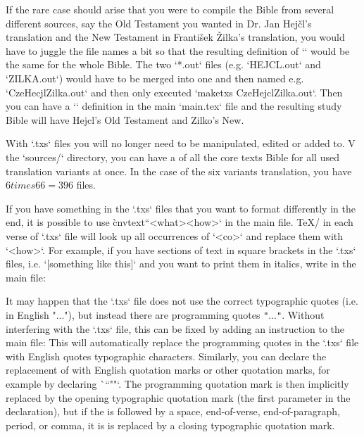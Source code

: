 If the rare case should arise that you were to compile the Bible from several different sources, say the Old Testament you wanted in Dr. Jan Hejčl's translation and the New Testament in František Žilka's translation, you would have to juggle the file names a bit so that the resulting definition of `\tmark` would be the same for the whole Bible. The two `*.out` files (e.g. `HEJCL.out` and `ZILKA.out`) would have to be merged into one and then named e.g. `CzeHecjlZilka.out` and then only executed 
`maketxs CzeHejclZilka.out`.  Then you can have a `\def\tmark{HejclZilka}` definition in the main `main.tex` file and 
the resulting study Bible will have Hejcl's Old Testament and Zilko's New.








With `.txs` files you will no longer
need to be manipulated, edited or added to. V
the `sources/` directory, you can have a  of all the core texts
Bible for all used translation variants at once. In the case of the six variants
translation, you have $6 times 66=396$ files.

If you have something in the `.txs` files that you want to format differently in the end, it is possible to
use \`cnvtext``{<what>}{<how>}` in the main file. \TeX/ in each verse of
`.txs` file will look up all occurrences of `<co>` and replace them with `<how>`.
For example, if you have sections of text in square brackets in the `.txs` files, i.e.
`[something like this]` and you want to print them in italics, write in the main file:
\begtt
\cnvtext{[}{\bgroup\it} \cnvtext{]}{\/\egroup}
\endtt

It may happen that the `.txs` file does not use the correct typographic quotes (i.e. in
English "..."), but instead there are programming quotes {\tt"}...{\tt"}. 
Without interfering with the `.txs` file, this can be fixed by adding an instruction to
the main file:
\begtt
{}
\endtt
This will automatically replace the programming quotes in the `.txs` file with English quotes
typographic characters. Similarly, you can declare the replacement of
with English quotation marks or other quotation marks, for example by declaring
\`\quotationmarks``{"}{"}`.
The programming quotation mark is then implicitly
replaced by the opening typographic quotation mark (the first parameter in the declaration), but if the
is followed by a space, end-of-verse, end-of-paragraph, period, or comma, it is
is replaced by a closing typographic quotation mark.

